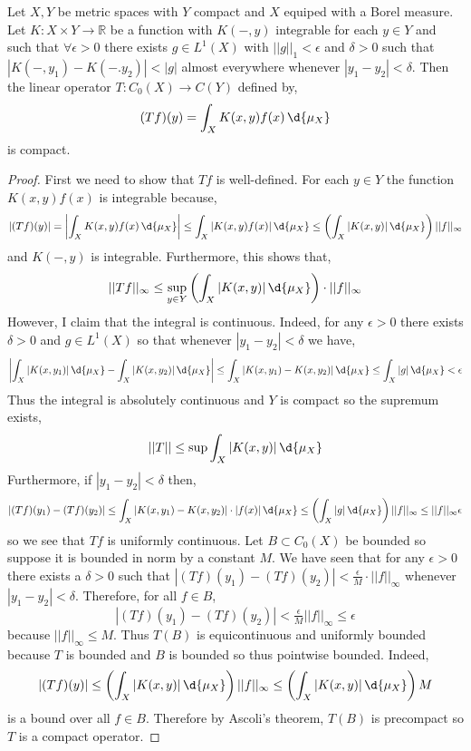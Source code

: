 \documentclass[12pt]{article}
\newcommand{\R}{\mathbb{R}}
\begin{document}
\begin{prop}
Let $X, Y$ be metric spaces with $Y$ compact and $X$ equiped with a Borel measure. Let $K : X \times Y \to \R$ be a function with $K(-,y)$ integrable for each $y \in Y$ and such that $\forall \epsilon > 0$ there exists $g \in L^1(X)$ with $|| g ||_1 < \epsilon$ and $\delta > 0$ such that $|K(-,y_1) - K(-.y_2)| < |g|$ almost everywhere whenever $|y_1 - y_2| < \delta$. Then the linear operator $T : C_0(X) \to C(Y)$ defined by,
\[ (T f)(y) = \int_X K(x, y) f(x) \, \d{\mu_X} \]
is compact.
\end{prop}

\begin{proof}
First we need to show that $T f$ is well-defined. For each $y \in Y$ the function $K(x, y) f(x)$ is integrable because,
\[ |(T f)(y)| = \left| \int_X K(x, y) f(x) \, \d{\mu_X} \right| \le \int_X | K(x, y) f(x) | \, \d{\mu_X} \le \left( \int_X |K(x, y)| \, \d{\mu_X} \right) || f ||_{\infty} \]
and $K(-,y)$ is integrable. Furthermore, this shows that,
\[ || T f ||_\infty \le \sup_{y \in Y} \left( \int_X |K(x, y)| \, \d{\mu_X} \right) \cdot || f ||_{\infty} \]
However, I claim that the integral is continuous. Indeed, for any $\epsilon > 0$ there exists $\delta > 0$ and $g \in L^1(X)$ so that whenever $|y_1 - y_2| < \delta$ we have,
\[ \left| \int_X |K(x, y_1)| \, \d{\mu_X} - \int_X |K(x, y_2)| \, \d{\mu_X} \right| \le \int_X |K(x, y_1) - K(x, y_2)| \, \d{\mu_X} \le \int_X |g| \, \d{\mu_X} < \epsilon \]
Thus the integral is absolutely continuous and $Y$ is compact so the supremum exists,
\[ || T || \le \sup \int_X |K(x, y)| \, \d{\mu_X} \]
Furthermore, if $|y_1 - y_2| < \delta$ then,
\[ | (T f)(y_1) - (T f)(y_2) | \le \int_X | K(x,y_1) - K(x,y_2) | \cdot |f(x) | \, \d{\mu_X} \le \left( \int_X |g| \, \d{\mu_X} \right) || f ||_\infty \le || f ||_{\infty} \epsilon \]
so we see that $T f$ is uniformly continuous. Let $B \subset C_0(X)$ be bounded so suppose it is bounded in norm by a constant $M$. We have seen that for any $\epsilon > 0$ there exists a $\delta > 0$ such that $| (T f)(y_1) - (T f)(y_2) | < \frac{\epsilon}{M} \cdot || f ||_{\infty}$ whenever $|y_1 - y_2| < \delta$. Therefore, for all $f \in B$,
\[ | (T f)(y_1) - (T f)(y_2) | < \tfrac{\epsilon}{M} || f ||_\infty \le \epsilon \]
because $|| f ||_{\infty} \le M$. Thus $T(B)$ is equicontinuous and uniformly bounded because $T$ is bounded and $B$ is bounded so thus pointwise bounded. Indeed,
\[ |(T f)(y)| \le \left( \int_X |K(x, y)| \, \d{\mu_X} \right) || f ||_{\infty} \le \left( \int_X |K(x, y)| \, \d{\mu_X} \right) M \]
is a bound over all $f \in B$. Therefore by Ascoli's theorem, $T(B)$ is precompact so $T$ is a compact operator. 
\end{proof}
\end{document}
